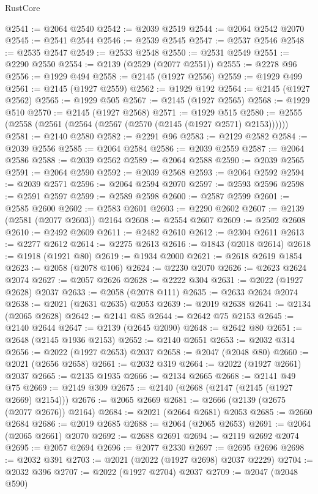 \begin{lexlean}{RustCore}
\begin{coremodule}
@2541 := @2064 @2540
@2542 := @2039 @2519
@2544 := @2064 @2542 @2070
@2545 := @2541 @2544
@2546 := @2539 @2545
@2547 := @2537 @2546
@2548 := @2535 @2547
@2549 := @2533 @2548
@2550 := @2531 @2549
@2551 := @2290 @2550
@2554 := @2139 (@2529 (@2077 @2551))
@2555 := @2278 @96
@2556 := @1929 @494
@2558 := @2145 (@1927 @2556)
@2559 := @1929 @499
@2561 := @2145 (@1927 @2559)
@2562 := @1929 @192
@2564 := @2145 (@1927 @2562)
@2565 := @1929 @505
@2567 := @2145 (@1927 @2565)
@2568 := @1929 @510
@2570 := @2145 (@1927 @2568)
@2571 := @1929 @515
@2580 := @2555 (@2558 (@2561 (@2564 (@2567 (@2570 (@2145 (@1927 @2571) @2153))))))
@2581 := @2140 @2580
@2582 := @2291 @96
@2583 := @2129 @2582
@2584 := @2039 @2556
@2585 := @2064 @2584
@2586 := @2039 @2559
@2587 := @2064 @2586
@2588 := @2039 @2562
@2589 := @2064 @2588
@2590 := @2039 @2565
@2591 := @2064 @2590
@2592 := @2039 @2568
@2593 := @2064 @2592
@2594 := @2039 @2571
@2596 := @2064 @2594 @2070
@2597 := @2593 @2596
@2598 := @2591 @2597
@2599 := @2589 @2598
@2600 := @2587 @2599
@2601 := @2585 @2600
@2602 := @2583 @2601
@2603 := @2290 @2602
@2607 := @2139 (@2581 (@2077 @2603)) @2164
@2608 := @2554 @2607
@2609 := @2502 @2608
@2610 := @2492 @2609
@2611 := @2482 @2610
@2612 := @2304 @2611
@2613 := @2277 @2612
@2614 := @2275 @2613
@2616 := @1843 (@2018 @2614)
@2618 := @1918 (@1921 @80)
@2619 := @1934 @2000
@2621 := @2618 @2619 @1854
@2623 := @2058 (@2078 @106)
@2624 := @2230 @2070
@2626 := @2623 @2624 @2074
@2627 := @2057 @2626
@2628 := @2222 @304
@2631 := @2022 (@1927 @2628) @2037
@2633 := @2058 (@2078 @111)
@2635 := @2633 @2624 @2074
@2638 := @2021 (@2631 @2635) @2053
@2639 := @2019 @2638
@2641 := @2134 (@2065 @2628)
@2642 := @2141 @85
@2644 := @2642 @75 @2153
@2645 := @2140 @2644
@2647 := @2139 (@2645 @2090)
@2648 := @2642 @80
@2651 := @2648 (@2145 @1936 @2153)
@2652 := @2140 @2651
@2653 := @2032 @314
@2656 := @2022 (@1927 @2653) @2037
@2658 := @2047 (@2048 @80)
@2660 := @2021 (@2656 @2658)
@2661 := @2032 @319
@2664 := @2022 (@1927 @2661) @2037
@2665 := @2135 @1935
@2666 := @2134 @2665
@2668 := @2141 @49 @75
@2669 := @2149 @309
@2675 := @2140 (@2668 (@2147 (@2145 (@1927 @2669) @2154)))
@2676 := @2065 @2669
@2681 := @2666 (@2139 (@2675 (@2077 @2676)) @2164)
@2684 := @2021 (@2664 @2681) @2053
@2685 := @2660 @2684
@2686 := @2019 @2685
@2688 := @2064 (@2065 @2653)
@2691 := @2064 (@2065 @2661) @2070
@2692 := @2688 @2691
@2694 := @2119 @2692 @2074
@2695 := @2057 @2694
@2696 := @2077 @2330
@2697 := @2695 @2696
@2698 := @2032 @391
@2703 := @2021 (@2022 (@1927 @2698) @2037 @2229)
@2704 := @2032 @396
@2707 := @2022 (@1927 @2704) @2037
@2709 := @2047 (@2048 @590)

\end{coremodule}
\end{lexlean}
